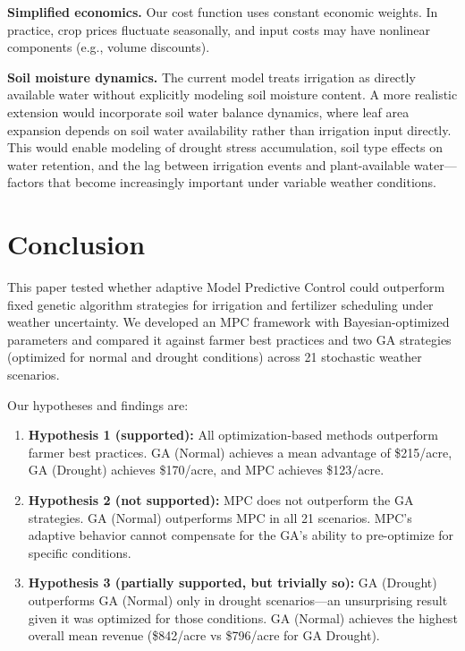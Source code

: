 \documentclass[preprint,12pt]{elsarticle}
\begin{document}
\textbf{Simplified economics.} Our cost function uses constant economic weights. In practice, crop prices fluctuate seasonally, and input costs may have nonlinear components (e.g., volume discounts).

\textbf{Soil moisture dynamics.} The current model treats irrigation as directly available water without explicitly modeling soil moisture content. A more realistic extension would incorporate soil water balance dynamics, where leaf area expansion depends on soil water availability rather than irrigation input directly. This would enable modeling of drought stress accumulation, soil type effects on water retention, and the lag between irrigation events and plant-available water---factors that become increasingly important under variable weather conditions.


\section{Conclusion}\label{sec:conclusion}

This paper tested whether adaptive Model Predictive Control could outperform fixed genetic algorithm strategies for irrigation and fertilizer scheduling under weather uncertainty. We developed an MPC framework with Bayesian-optimized parameters and compared it against farmer best practices and two GA strategies (optimized for normal and drought conditions) across 21 stochastic weather scenarios.

Our hypotheses and findings are:

\begin{enumerate}
\item \textbf{Hypothesis 1 (supported):} All optimization-based methods outperform farmer best practices. GA (Normal) achieves a mean advantage of \$215/acre, GA (Drought) achieves \$170/acre, and MPC achieves \$123/acre.

\item \textbf{Hypothesis 2 (not supported):} MPC does not outperform the GA strategies. GA (Normal) outperforms MPC in all 21 scenarios. MPC's adaptive behavior cannot compensate for the GA's ability to pre-optimize for specific conditions.

\item \textbf{Hypothesis 3 (partially supported, but trivially so):} GA (Drought) outperforms GA (Normal) only in drought scenarios---an unsurprising result given it was optimized for those conditions. GA (Normal) achieves the highest overall mean revenue (\$842/acre vs \$796/acre for GA Drought).
\end{enumerate}
\end{document}
